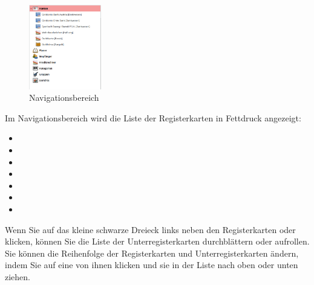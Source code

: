 \begin{figure}%
\vspace{-\intextsep}				%
\centering							%
\includegraphics[width=0.28\textwidth]{image/screenshot/home_navigation}
\vspace{-5pt}						%
\captionsetup{%
	format=plain,					%
	name=Fig.,						%
	justification=centering,		%
	labelsep=newline				%
}
\caption{Navigationsbereich}		%
\vspace{-40pt}						%
\label{home_navigation}
\end{figure}

Im Navigationsbereich wird die Liste der Registerkarten in Fettdruck angezeigt:
	\begin{itemize}
		\item {}%
		\item {}%
		\item {}%
		\item {}%
		\item {}%
		\item {}%
		\item {}%
	\end{itemize}
Wenn Sie auf das kleine schwarze Dreieck links neben den Registerkarten  oder  klicken, können Sie die Liste der Unterregisterkarten durchblättern oder aufrollen. Sie können die Reihenfolge der Registerkarten und Unterregisterkarten ändern, indem Sie auf eine von ihnen klicken und sie in der Liste nach oben oder unten ziehen.%

